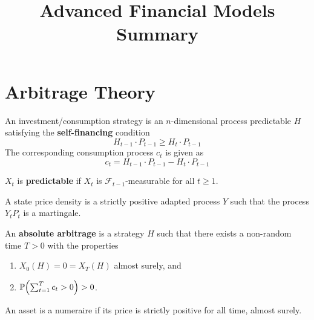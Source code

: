

\title{Advanced Financial Models Summary}



\maketitle

\section{Arbitrage Theory}
\label{sec:arbitrage-theory}

\begin{defn}
  \label{sec:arbitrage-theory-1}
  An investment/consumption strategy is an $n$-dimensional process
  predictable $H$ satisfying the \textbf{self-financing} condition
  \begin{equation}
    \label{eq:1}
    H_{t-1} \cdot P_{t-1} \geq H_{t} \cdot P_{t-1}
  \end{equation}
  The corresponding consumption process $c_{t}$ is given as
  \begin{equation}
    \label{eq:2}
    c_{t} = H_{t-1} \cdot P_{t-1} - H_{t} \cdot P_{t-1}
  \end{equation}
\end{defn}

\begin{defn}
  \label{sec:arbitrage-theory-2}
  $X_{t}$ is \textbf{predictable} if $X_{t}$ is
  $\mathcal{F}_{t-1}$-measurable for all $t \geq 1$.
\end{defn}

\begin{defn}
  \label{sec:arbitrage-theory-3}
  A state price density is a strictly positive adapted process $Y$
  such that the process $Y_{t} P_{t}$ is a martingale.
\end{defn}

\begin{defn}
  \label{sec:arbitrage-theory-4}
  An \textbf{absolute arbitrage} is a strategy $H$ such that there
  exists a non-random time $T > 0$ with the properties
  \begin{enumerate}
  \item $X_{0}(H) = 0 = X_{T}(H)$ almost surely, and
  \item $\Prob{\sum_{t=1}^{T} c_{t} > 0} > 0$.
  \end{enumerate}
\end{defn}

\begin{defn}
  \label{sec:arbitrage-theory-5}
  An asset is a \textnormal{numeraire} if its price is strictly
  positive for all time, almost surely.
\end{defn}

